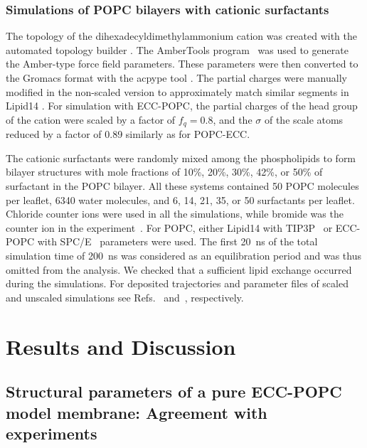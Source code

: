 \documentclass[journal=jpcbfk,manuscript=article]{achemso}
\begin{document}
\subsubsection{Simulations of POPC bilayers with cationic surfactants}
The topology of the dihexadecyldimethylammonium cation was created with the automated topology builder \cite{malde11}. The AmberTools program~\cite{amber} was used to generate the Amber-type force field parameters. These parameters were then converted to the Gromacs format with the acpype tool \cite{acpype}. The partial charges were manually modified in the non-scaled version to approximately match similar segments in Lipid14 \cite{dickson14}. For simulation with ECC-POPC, the partial charges of the head group of the cation were scaled by a factor of $f_q=0.8$, and the $\sigma$ of the scale atoms reduced by a factor of 0.89 similarly as for POPC-ECC.

The cationic surfactants were randomly mixed among the phospholipids to form bilayer structures with mole fractions of 10\%, 20\%, 30\%, 42\%, or 50\% of surfactant in the POPC bilayer. All these systems contained 50 POPC molecules per leaflet, 6340 water molecules, and 6, 14, 21, 35, or 50 surfactants per leaflet.  Chloride counter ions were used in all the simulations, while bromide was the counter ion in the experiment~\cite{scherer89}. For POPC, either Lipid14 with TIP3P~\cite{jorgensen83} or ECC-POPC with SPC/E~\cite{Berendsen1987} parameters  were used. The first 20~ns of the total simulation time of 200~ns was considered as an equilibration period and was thus omitted from the analysis. We checked that a sufficient lipid  exchange occurred during the simulations.
For deposited trajectories and parameter files of scaled and unscaled simulations see
Refs.~ and~, respectively.

\section{Results and Discussion}

\subsection{Structural parameters of a pure ECC-POPC model membrane: Agreement with experiments}
\end{document}
